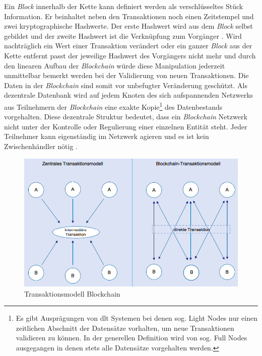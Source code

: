 Ein \textit{Block} innerhalb der Kette kann definiert werden als verschlüsseltes Stück Information. Er beinhaltet neben den Transaktionen noch einen Zeitstempel und zwei kryptographische Hashwerte. Der erste Hashwert wird aus dem \textit{Block} selbst gebildet und der zweite Hashwert ist die Verknüpfung zum Vorgänger \citep{Tschorsch2016}. Wird nachträglich ein Wert einer Transaktion verändert oder ein ganzer \textit{Block} aus der Kette entfernt passt der jeweilige Hashwert des Vorgängers nicht mehr und durch den linearen Aufbau der \textit{Blockchain} würde diese Manipulation jederzeit unmittelbar bemerkt werden bei der Validierung von neuen Transaktionen. Die Daten in der \textit{Blockchain} sind somit vor unbefugter Veränderung geschützt. Als dezentrale Datenbank wird auf jedem Knoten des sich aufspannenden Netzwerks aus Teilnehmern der \textit{Blockchain} eine exakte Kopie\footnote{Es gibt Ausprägungen von \ac{dlt} Systemen bei denen sog. Light Nodes nur einen zeitlichen Abschnitt der Datensätze vorhalten, um neue Transaktionen validieren zu können. In der generellen Definition wird von sog. Full Nodes ausgegangen in denen stets alle Datensätze vorgehalten werden.} des Datenbestands vorgehalten. Diese dezentrale Struktur bedeutet, dass ein \textit{Blockchain} Netzwerk nicht unter der Kontrolle oder Regulierung einer einzelnen Entität steht. Jeder Teilnehmer kann eigenständig im Netzwerk agieren und es ist kein Zwischenhändler nötig \citep{Drescher2017, Meier2018}.

\begin{figure}[H]
	\centering
	\includegraphics[width=1.0\linewidth]{pictures/change-in-transaction-model-blockchain}
	\caption[Transaktionsmodell Blockchain]{Transaktionsmodell Blockchain \citep{Wald2017}}
	\label{fig:change-in-transaction-model-blockchain}
\end{figure}

